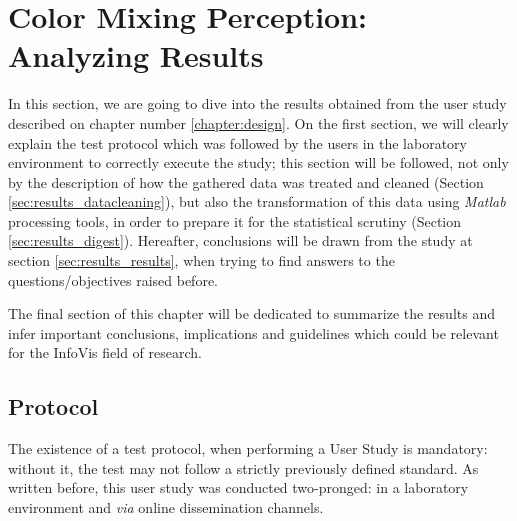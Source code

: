 
\chapter{Color Mixing Perception: Analyzing Results}
\label{chapter:results}
%
In this section, we are going to dive into the results obtained from the user study described on chapter number \ref{chapter:design}.
On the first section, we will clearly explain the test protocol which was followed by the users in the laboratory environment to correctly
execute the study; this section will be followed, not only by the description of how the gathered data was treated and cleaned
(Section \ref{sec:results_datacleaning}), but also the transformation of this data using \emph{Matlab} processing tools, in order to prepare
it for the statistical scrutiny (Section \ref{sec:results_digest}). Hereafter, conclusions will be drawn from the study at section
\ref{sec:results_results}, when trying to find answers to the questions/objectives raised before. \par
%
The final section of this chapter will be dedicated to summarize the results and infer important conclusions, implications and guidelines which
could be relevant for the InfoVis field of research.
%
\section{Protocol}
\label{sec:results_protocol}
%
The existence of a test protocol, when performing a User Study is mandatory: without it, the test may not follow a strictly previously defined
standard. As written before, this user study was conducted two-pronged: in a laboratory environment and \emph{via} online dissemination channels. \par
%
